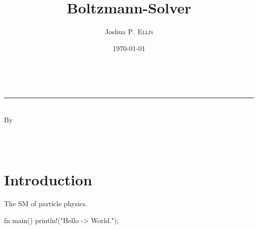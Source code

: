 \documentclass[
  a4paper,             %
  11pt,                %
  oneside,             %
  onecolumn,           %
  bibliography=totoc,  %
  final,               %
]{scrartcl}
\title{Boltzmann-Solver}
\author{Joshua P.~\textsc{Ellis}}
\date{\today}
\makeatletter
\newcommand\@degreetitle{}
\newcommand\@department{}
\newcommand\@university{}
\makeatother
\begin{document}

\pagestyle{empty}

\begin{titlepage}
  \makeatletter
  \begin{center}
    \vspace*{2.5cm}

    {\Huge \@title} \\[0em]
    \rule{\linewidth}{2pt}
    {\huge \textsc{\@subtitle}} \\[6em]

    {\large By} \\[1cm]
    {\huge \@author} \\[0.5ex]
    {\Large \normalfont \@degreetitle}

    \vfill

    {\Large \@department} \\[1ex]
    {\Large \@university}

    \vfill

    {\large \@date}
  \end{center}

  \makeatother
\end{titlepage}

\cleardoublepage
{}
\pagestyle{plain}

\tableofcontents

\cleardoublepage
\pagestyle{headings}

\section{Introduction}
\label{sec:introduction}

The \gls{SM} of particle physics.


\begin{rustcode}
  fn main() {
      println!("Hello -> World.");
  }
\end{rustcode}

\cleardoublepage
\appendix
{}
\pagestyle{plain}

\printglossaries

\cleardoublepage
\pagestyle{plain}
\printbibliography
\end{document}
